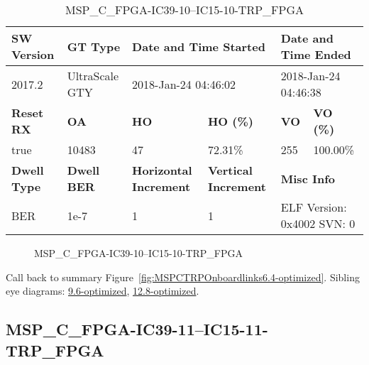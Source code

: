 \begin{table}[h]
\centering
\caption{MSP\_C\_FPGA-IC39-10--IC15-10-TRP\_FPGA}
\label{tab:MSPCFPGAIC3910IC1510TRPFPGA6.4-optimized}
\begin{tabular}{@{}|l|l|l|l|l|l|@{}}
\toprule
\textbf{SW Version}                & \textbf{GT Type}   & \multicolumn{2}{l|}{\textbf{Date and Time Started}}            & \multicolumn{2}{l|}{\textbf{Date and Time Ended}}        \\ \midrule
2017.2                       & UltraScale GTY          & \multicolumn{2}{l|}{2018-Jan-24 04:46:02}                   & \multicolumn{2}{l|}{2018-Jan-24 04:46:38}               \\ \midrule
\textbf{Reset RX}                  & \textbf{OA} & \textbf{HO}   & \textbf{HO (\%)} & \textbf{VO} & \textbf{VO (\%)} \\ \midrule
true & 10483        & 47          & 72.31\%        & 255        & 100.00\%       \\ \midrule
\textbf{Dwell Type}                & \textbf{Dwell BER} & \textbf{Horizontal Increment} & \textbf{Vertical Increment}    & \multicolumn{2}{l|}{\textbf{Misc Info}}                  \\ \midrule
BER                            & 1e-7        & 1        & 1           & \multicolumn{2}{l|}{ELF Version: 0x4002 SVN: 0}                         \\ \bottomrule
\end{tabular}
\end{table}

\begin{figure}[h]
\caption{MSP\_C\_FPGA-IC39-10--IC15-10-TRP\_FPGA} \label{fig:MSPCFPGAIC3910IC1510TRPFPGA6.4-optimized}
\end{figure}

Call back to summary Figure~\ref{fig:MSPCTRPOnboardlinks6.4-optimized}.
Sibling eye diagrams: \hyperref[sec:MSPCFPGAIC3910IC1510TRPFPGA9.6-optimized]{9.6-optimized}, \hyperref[sec:MSPCFPGAIC3910IC1510TRPFPGA12.8-optimized]{12.8-optimized}.

\clearpage
\newpage


\subsection{MSP\_C\_FPGA-IC39-11--IC15-11-TRP\_FPGA}\label{sec:MSPCFPGAIC3911IC1511TRPFPGA6.4-optimized}

